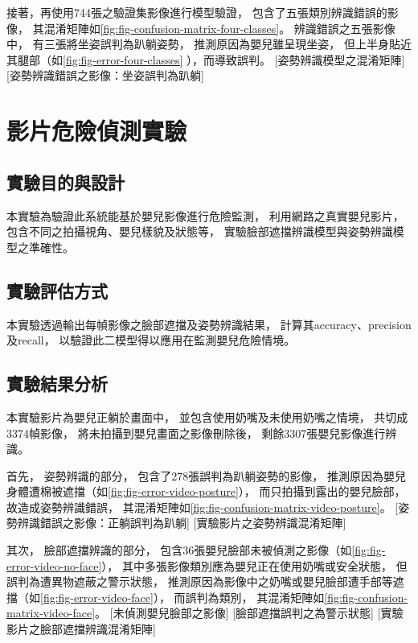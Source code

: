 \documentclass[class=NCU_thesis, crop=false]{standalone}
\begin{document}
接著，再使用744張之驗證集影像進行模型驗證，
包含了五張類別辨識錯誤的影像，
其混淆矩陣如\cref{fig:fig-confusion-matrix-four-classes}。
辨識錯誤之五張影像中，
有三張將坐姿誤判為趴躺姿勢，
推測原因為嬰兒雖呈現坐姿，
但上半身貼近其腿部（如\cref{fig:fig-error-four-classes}
），而導致誤判。
[姿勢辨識模型之混淆矩陣]
[姿勢辨識錯誤之影像：坐姿誤判為趴躺]

\section{影片危險偵測實驗}
\subsection{實驗目的與設計}
本實驗為驗證此系統能基於嬰兒影像進行危險監測，
利用網路之真實嬰兒影片，
包含不同之拍攝視角、嬰兒樣貌及狀態等，
實驗臉部遮擋辨識模型與姿勢辨識模型之準確性。

\subsection{實驗評估方式}
本實驗透過輸出每幀影像之臉部遮擋及姿勢辨識結果，
計算其accuracy、precision及recall，
以驗證此二模型得以應用在監測嬰兒危險情境。

\subsection{實驗結果分析}
本實驗影片為嬰兒正躺於畫面中，
並包含使用奶嘴及未使用奶嘴之情境，
共切成3374幀影像，
將未拍攝到嬰兒畫面之影像刪除後，
剩餘3307張嬰兒影像進行辨識。

首先，
姿勢辨識的部分，
包含了278張誤判為趴躺姿勢的影像，
推測原因為嬰兒身體遭棉被遮擋（如\cref{fig:fig-error-video-posture}），
而只拍攝到露出的嬰兒臉部，
故造成姿勢辨識錯誤，
其混淆矩陣如\cref{fig:fig-confusion-matrix-video-posture}。
[姿勢辨識錯誤之影像：正躺誤判為趴躺]
[實驗影片之姿勢辨識混淆矩陣]

其次，
臉部遮擋辨識的部分，
包含36張嬰兒臉部未被偵測之影像（如\cref{fig:fig-error-video-no-face}），
其中多張影像類別應為嬰兒正在使用奶嘴或安全狀態，
但誤判為遭異物遮蔽之警示狀態，
推測原因為影像中之奶嘴或嬰兒臉部遭手部等遮擋（如\cref{fig:fig-error-video-face}），
而誤判為類別，
其混淆矩陣如\cref{fig:fig-confusion-matrix-video-face}。
[未偵測嬰兒臉部之影像]
[臉部遮擋誤判之為警示狀態]
[實驗影片之臉部遮擋辨識混淆矩陣]
\end{document}
